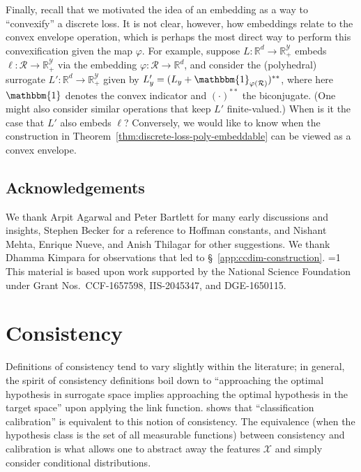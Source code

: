 \documentclass[twoside,11pt]{article}
\newcommand{\Comments}{1}
\newcommand{\mytodo}[2]{\ifnum\Comments=1%
  \todo[linecolor=#1!80!black,backgroundcolor=#1,bordercolor=#1!80!black]{#2}\fi}
\newcommand{\raft}[1]{\mytodo{green!20!white}{RF: #1}}
\newcommand{\reals}{\mathbb{R}}
\newcommand{\R}{\mathcal{R}}
\newcommand{\X}{\mathcal{X}}
\newcommand{\Y}{\mathcal{Y}}
\newcommand{\ones}{\mathbbm{1}}
\begin{document}
Finally, recall that we motivated the idea of an embedding as a way to ``convexify'' a discrete loss.
It is not clear, however, how embeddings relate to the convex envelope operation, which is perhaps the most direct way to perform this convexification given the map $\varphi$.
For example, suppose $L:\reals^d\to\reals^\Y_+$ embeds $\ell:\R\to\reals^\Y_+$ via the embedding $\varphi:\R\to\reals^d$, and consider the (polyhedral) surrogate $L':\reals^d\to\reals^\Y_+$ given by $L'_y = (L_y + \ones_{\varphi(\R)})^{**}$, where here $\ones$ denotes the convex indicator and $(\cdot)^{**}$ the biconjugate.
(One might also consider similar operations that keep $L'$ finite-valued.)
When is it the case that $L'$ also embeds $\ell$?
Conversely, we would like to know when the construction in Theorem~\ref{thm:discrete-loss-poly-embeddable} can be viewed as a convex envelope.


\subsection*{Acknowledgements}
We thank Arpit Agarwal and Peter Bartlett for many early discussions and insights,
Stephen Becker for a reference to Hoffman constants,
and Nishant Mehta, Enrique Nueve, and Anish Thilagar for other suggestions.
We thank Dhamma Kimpara for observations that led to \S~\ref{app:ccdim-construction}.
\raft{others?}
This material is based upon work supported by the National Science Foundation under Grant Nos.\ CCF-1657598, IIS-2045347, and DGE-1650115.





\appendix

\section{Consistency}\label{app:consistency}
Definitions of consistency tend to vary slightly within the literature; in general, the spirit of consistency definitions boil down to ``approaching the optimal hypothesis in surrogate space implies approaching the optimal hypothesis in the target space'' upon applying the link function.
\citet[Theorem 1]{bartlett2006convexity} shows that ``classification calibration'' is equivalent to this notion of consistency.
The equivalence (when the hypothesis class is the set of all measurable functions) between consistency and calibration is what allows one to abstract away the features $\X$ and simply consider conditional distributions.
\end{document}
